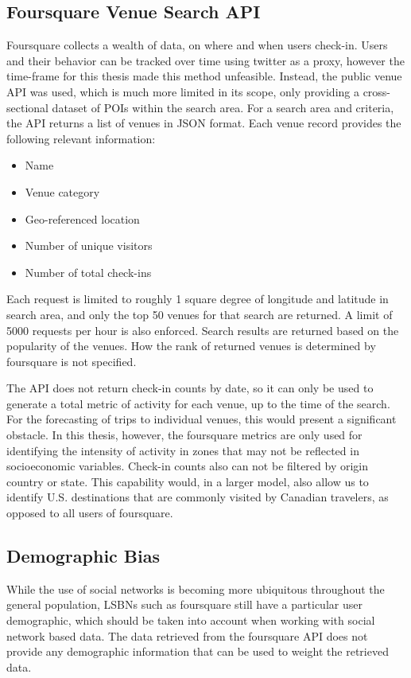 \subsection{Foursquare Venue Search API}
Foursquare collects a wealth of data, on where and when users check-in. Users and their behavior can be tracked over time using twitter as a proxy, however the time-frame for this thesis made this method unfeasible. Instead, the public venue API was used, which is much more limited in its scope, only providing a cross-sectional dataset of POIs within the search area. For a search area and criteria, the API returns a list of venues in JSON format. Each venue record provides the following relevant information:
\begin{itemize}
\item Name
\item Venue category
\item Geo-referenced location
\item Number of unique visitors
\item Number of total check-ins
\end{itemize}

Each request is limited to roughly 1 square degree of longitude and latitude in search area, and only the top 50 venues for that search are returned. A limit of 5000 requests per hour is also enforced. Search results are returned based on the popularity of the venues. How the rank of returned venues is determined by foursquare is not specified. 

The API does not return check-in counts by date, so it can only be used to generate a total metric of activity for each venue, up to the time of the search. For the forecasting of trips to individual venues, this would present a significant obstacle. In this thesis, however, the foursquare metrics are only used for identifying the intensity of activity in zones that may not be reflected in socioeconomic variables. Check-in counts also can not be filtered by origin country or state. This capability would, in a larger model, also allow us to identify U.S. destinations that are commonly visited by Canadian travelers, as opposed to all users of foursquare.

\subsection{Demographic Bias}
While the use of social networks is becoming more ubiquitous throughout the general population, LSBNs such as foursquare still have a particular user demographic, which should be taken into account when working with social network based data. The data retrieved from the foursquare API does not provide any demographic information that can be used to weight the retrieved data.

